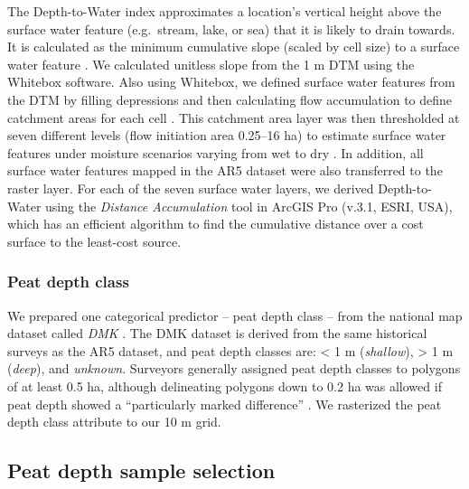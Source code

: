 \documentclass[soil, manuscript]{copernicus}
\begin{document}
The Depth-to-Water index \citep{murphyMappingWetlandsComparison2007} approximates a location's vertical height above the surface water feature (e.g.~stream, lake, or sea) that it is likely to drain towards.
It is calculated as the minimum cumulative slope (scaled by cell size) to a surface water feature \citep[eq. 5 in][]{murphyTopographicModellingSoil2009}.
We calculated unitless slope from the 1 m DTM using the Whitebox software.
Also using Whitebox, we defined surface water features from the DTM by filling depressions and then calculating flow accumulation to define catchment areas for each cell \citep{schonauerSpatiotemporalPredictionSoil2021, schonauerRcodeCalculatingDepthwater2021}.
This catchment area layer was then thresholded at seven different levels (flow initiation area 0.25--16 ha) to estimate surface water features under moisture scenarios varying from wet to dry \citep{murphyModellingMappingTopographic2011, agrenEvaluatingDigitalTerrain2014, schonauerSpatiotemporalPredictionSoil2021}.
In addition, all surface water features mapped in the AR5 dataset were also transferred to the raster layer.
For each of the seven surface water layers, we derived Depth-to-Water using the \emph{Distance Accumulation} tool in ArcGIS Pro (v.3.1, ESRI, USA), which has an efficient algorithm to find the cumulative distance over a cost surface to the least-cost source.

\subsubsection{Peat depth class}

We prepared one categorical predictor -- peat depth class -- from the national map dataset called \emph{DMK} \citep{ahlstromAR5Klassifikasjonssystem2019}.
The DMK dataset is derived from the same historical surveys as the AR5 dataset, and peat depth classes are: \textless{} 1 m (\emph{shallow}), \textgreater{} 1 m (\emph{deep}), and \emph{unknown}.
Surveyors generally assigned peat depth classes to polygons of at least 0.5 ha, although delineating polygons down to 0.2 ha was allowed if peat depth showed a ``particularly marked difference'' \citep{bjordalMarkslagsklassifikasjonOkonomiskKartverk2007}.
We rasterized the peat depth class attribute to our 10 m grid.

\subsection{Peat depth sample selection}
\end{document}
